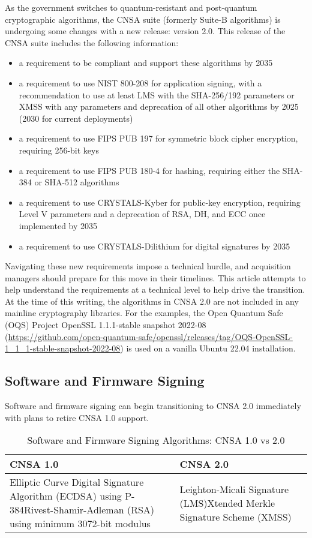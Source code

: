 As the government switches to quantum-resistant and post-quantum cryptographic algorithms, the CNSA suite (formerly Suite-B algorithms) is undergoing some changes with a new release: version 2.0. This release of the CNSA suite includes the following information:\autocite{20220919:cnsa}
\begin{itemize}
	\item a requirement to be compliant and support these algorithms by 2035
	\item a requirement to use NIST 800-208 for application signing, with a recommendation to use at least LMS with the SHA-256/192 parameters or XMSS with any parameters and deprecation of all other algorithms by 2025 (2030 for current deployments)
	\item a requirement to use FIPS PUB 197 for symmetric block cipher encryption, requiring 256-bit keys
	\item a requirement to use FIPS PUB 180-4 for hashing, requiring either the SHA-384 or SHA-512 algorithms
	\item a requirement to use CRYSTALS-Kyber for public-key encryption, requiring Level V parameters and a deprecation of RSA, DH, and ECC once implemented by 2035
	\item a requirement to use CRYSTALS-Dilithium for digital signatures by 2035
\end{itemize}

Navigating these new requirements impose a technical hurdle, and acquisition managers should prepare for this move in their timelines. This article attempts to help understand the requirements at a technical level to help drive the transition. At the time of this writing, the algorithms in CNSA 2.0 are not included in any mainline cryptography libraries. For the examples, the Open Quantum Safe (OQS) Project OpenSSL 1.1.1-stable snapshot 2022-08 (\url{https://github.com/open-quantum-safe/openssl/releases/tag/OQS-OpenSSL-1_1_1-stable-snapshot-2022-08}) is used on a vanilla Ubuntu 22.04 installation.

\subsection{Software and Firmware Signing}
Software and firmware signing can begin transitioning to CNSA 2.0 immediately with plans to retire CNSA 1.0 support.

\begin{table}
\begin{tabular}{|p{}|p{}|}
	\hline
	\textbf{CNSA 1.0} & \textbf{CNSA 2.0} \\
	\hline
	Elliptic Curve Digital Signature Algorithm (ECDSA) using P-384\newline Rivest-Shamir-Adleman (RSA) using minimum 3072-bit modulus & Leighton-Micali Signature (LMS)\newline Xtended Merkle Signature Scheme (XMSS) \\
	\hline
\end{tabular}
\caption{Software and Firmware Signing Algorithms: CNSA 1.0 vs 2.0}
\end{table}

